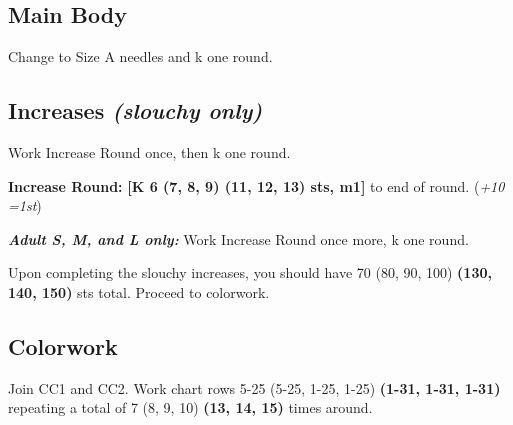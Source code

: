 \documentclass[12pt]{article}
\newcommand{\vocab}[1]{\emph{\textbf{#1}}} %
\renewcommand{\repeat}[1]{\textbf{[#1]}} %
\newcommand{\increase}[1]{(\emph{+#1 
	\ifnum#1=1{st}\else{sts}\fi})}
\newenvironment{frnote}
    {%
    	\setlength{\FrameRule}{1.5pt}
    	\def\FrameCommand{\fboxrule=\FrameRule\fboxsep=\FrameSep \fcolorbox{framecolor}{shadecolor}}
    	\MakeFramed {\FrameRestore}}
    {\setlength{\FrameRule}{1pt}
	\endMakeFramed}
\begin{document}
\begin{multicols}{2}
\section*{Main Body}

Change to Size A needles and k one round. 

\vspace{-1em}
\subsection*{Increases \emph{(slouchy only)}}

Work Increase Round once, then k one round.

\textbf{Increase Round:} \repeat{K 6 (7, 8, 9) (11, 12, 13) sts, m1} to end of round. \increase{10}

\begin{frnote}
\vocab{Adult S, M, and L only:} Work Increase Round once more, k one round.
\end{frnote}

Upon completing the slouchy increases, you should have 70 (80, 90, 100) \textbf{(130, 140, 150)} sts total. Proceed to colorwork.

\subsection*{Colorwork}

Join CC1 and CC2. Work chart rows 5-25 (5-25, 1-25, 1-25) \textbf{(1-31, 1-31, 1-31)} repeating a total of 7 (8, 9, 10) \textbf{(13, 14, 15)} times around.


\end{multicols}
\end{document}

